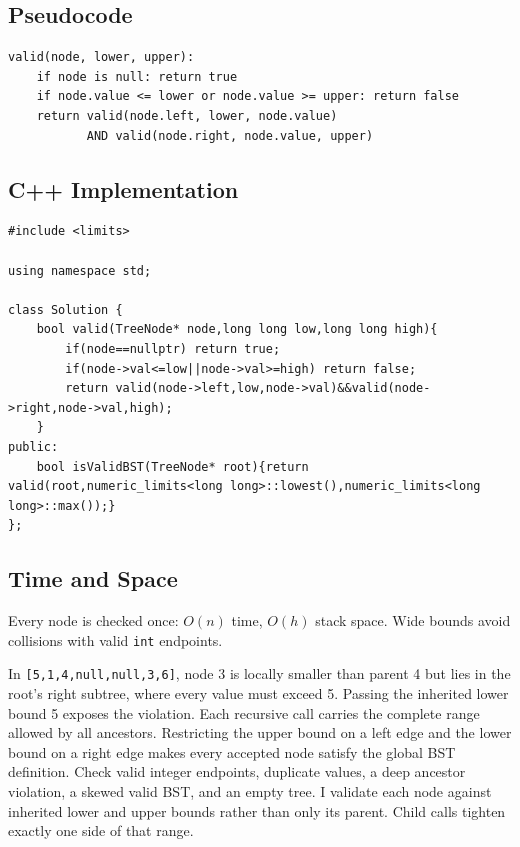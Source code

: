 \subsection{Pseudocode}
\begin{lstlisting}[style=pseudocode]
valid(node, lower, upper):
    if node is null: return true
    if node.value <= lower or node.value >= upper: return false
    return valid(node.left, lower, node.value)
           AND valid(node.right, node.value, upper)
\end{lstlisting}

\subsection{C++ Implementation}
\begin{lstlisting}[style=compactcode,caption={Complete C++ solution: Validate BST}]
#include <limits>

using namespace std;

class Solution {
    bool valid(TreeNode* node,long long low,long long high){
        if(node==nullptr) return true;
        if(node->val<=low||node->val>=high) return false;
        return valid(node->left,low,node->val)&&valid(node->right,node->val,high);
    }
public:
    bool isValidBST(TreeNode* root){return valid(root,numeric_limits<long long>::lowest(),numeric_limits<long long>::max());}
};
\end{lstlisting}

\subsection{Time and Space}
Every node is checked once: \(O(n)\) time, \(O(h)\) stack space. Wide bounds
avoid collisions with valid \texttt{int} endpoints.

\lessonexpansion
  {In \texttt{[5,1,4,null,null,3,6]}, node 3 is locally smaller than parent 4
   but lies in the root's right subtree, where every value must exceed 5.
   Passing the inherited lower bound 5 exposes the violation.}
  {Each recursive call carries the complete range allowed by all ancestors.
   Restricting the upper bound on a left edge and the lower bound on a right
   edge makes every accepted node satisfy the global BST definition.}
  {Check valid integer endpoints, duplicate values, a deep ancestor violation,
   a skewed valid BST, and an empty tree.}
  {I validate each node against inherited lower and upper bounds rather than
   only its parent. Child calls tighten exactly one side of that range.}

